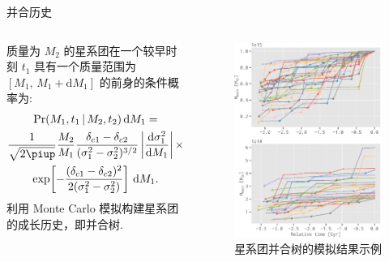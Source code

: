\documentclass{beamer}
\newcommand{\R}[1]{\text{#1}}  %
\newcommand{\Cpi}{\piup}  %
\newcommand{\D}[1]{\R{d}#1}
\newcommand{\diff}[2]{\frac{\D{#1}}{\D{#2}}}
\begin{document}
\begin{frame}{并合历史}
  \begin{columns}
    质量为 $M_2$ 的星系团在一个较早时刻 $t_1$ 具有一个质量范围为
    $[M_1,\, M_1+\D{M_1}]$ 的前身的条件概率为:
    \begin{multline}
      \R{Pr}(M_1, t_1 \,|\, M_2, t_2) \,\D{M_1} = \\
        \frac{1}{\sqrt{2\Cpi}} \frac{M_2}{M_1}
        \frac{\delta_{c1} - \delta_{c2}}{(\sigma_1^2 - \sigma_2^2)^{3/2}}
        \left| \diff{\sigma_1^2}{M_1} \right|
        \times \\
        \exp \!\left[ -\frac{(\delta_{c1} - \delta_{c2})^2}
        {2(\sigma_1^2 - \sigma_2^2)} \right] \,\D{M_1} .
    \end{multline}
    利用 Monte Carlo 模拟构建星系团的成长历史，即\alert{并合树}.

    \begin{figure}
      \centering
      \includegraphics[width=\columnwidth]{merging-history}
      \caption{星系团并合树的模拟结果示例}
    \end{figure}
  \end{columns}
\end{frame}
\end{document}
